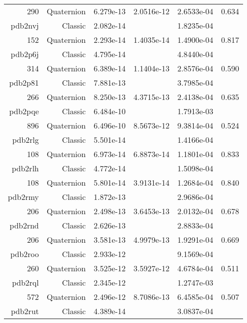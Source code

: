 \begin{xltabular}{\textwidth}{r|rS[table-format=1.3e+2]S[table-format=1.4e+2]S[table-format=1.4e+2]S[table-format=-1.3]}
290 & Quaternion & 6.279e-13 & 2.0516e-12 & 2.6533e-04 & 0.634\\  \addlinespace
{\color{red} pdb2nvj } & Classic & 2.082e-14 &  & 1.8235e-04 & \\
152 & Quaternion & 2.293e-14 & 1.4035e-14 & 1.4900e-04 & 0.817\\  \addlinespace
{\color{red} pdb2p6j } & Classic & 4.795e-14 &  & 4.8440e-04 & \\
314 & Quaternion & 6.389e-14 & 1.1404e-13 & 2.8576e-04 & 0.590\\  \addlinespace
{\color{red} pdb2p81 } & Classic & 7.881e-13 &  & 3.7985e-04 & \\
266 & Quaternion & 8.250e-13 & 4.3715e-13 & 2.4138e-04 & 0.635\\  \addlinespace
{\color{red} pdb2pqe } & Classic & 6.484e-10 &  & 1.7913e-03 & \\
896 & Quaternion & 6.496e-10 & 8.5673e-12 & 9.3814e-04 & 0.524\\  \addlinespace
{\color{red} pdb2rlg } & Classic & 5.501e-14 &  & 1.4166e-04 & \\
108 & Quaternion & 6.973e-14 & 6.8873e-14 & 1.1801e-04 & 0.833\\  \addlinespace
{\color{red} pdb2rlh } & Classic & 4.772e-14 &  & 1.5098e-04 & \\
108 & Quaternion & 5.801e-14 & 3.9131e-14 & 1.2684e-04 & 0.840\\  \addlinespace
{\color{red} pdb2rmy } & Classic & 1.872e-13 &  & 2.9686e-04 & \\
206 & Quaternion & 2.498e-13 & 3.6453e-13 & 2.0132e-04 & 0.678\\  \addlinespace
{\color{red} pdb2rnd } & Classic & 2.626e-13 &  & 2.8833e-04 & \\
206 & Quaternion & 3.581e-13 & 4.9979e-13 & 1.9291e-04 & 0.669\\  \addlinespace
{\color{red} pdb2roo } & Classic & 2.933e-12 &  & 9.1569e-04 & \\
260 & Quaternion & 3.525e-12 & 3.5927e-12 & 4.6784e-04 & 0.511\\  \addlinespace
{\color{red} pdb2rql } & Classic & 2.345e-12 &  & 1.2747e-03 & \\
572 & Quaternion & 2.496e-12 & 8.7086e-13 & 6.4585e-04 & 0.507\\  \addlinespace
{\color{red} pdb2rut } & Classic & 4.389e-14 &  & 3.0837e-04 & \\

\end{xltabular}
